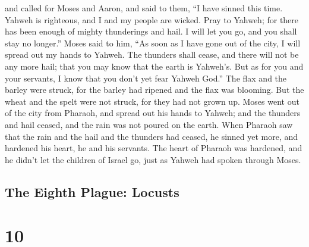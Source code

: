 and called for Moses and Aaron, and said to them, ``I have sinned this
time. Yahweh is righteous, and I and my people are wicked.
 Pray to Yahweh; for there has been enough of mighty
thunderings and hail. I will let you go, and you shall stay no longer.''
 Moses said to him, ``As soon as I have gone out of the
city, I will spread out my hands to Yahweh. The thunders shall cease,
and there will not be any more hail; that you may know that the earth is
Yahweh's.  But as for you and your servants, I know that
you don't yet fear Yahweh God.''  The flax and the barley
were struck, for the barley had ripened and the flax was blooming.
 But the wheat and the spelt were not struck, for they
had not grown up.  Moses went out of the city from
Pharaoh, and spread out his hands to Yahweh; and the thunders and hail
ceased, and the rain was not poured on the earth.  When
Pharaoh saw that the rain and the hail and the thunders had ceased, he
sinned yet more, and hardened his heart, he and his servants.
 The heart of Pharaoh was hardened, and he didn't let the
children of Israel go, just as Yahweh had spoken through Moses.

\hypertarget{the-eighth-plague-locusts}{%
\subsection{The Eighth Plague:
Locusts}\label{the-eighth-plague-locusts}}

\hypertarget{section-9}{%
\section{10}\label{section-9}}


